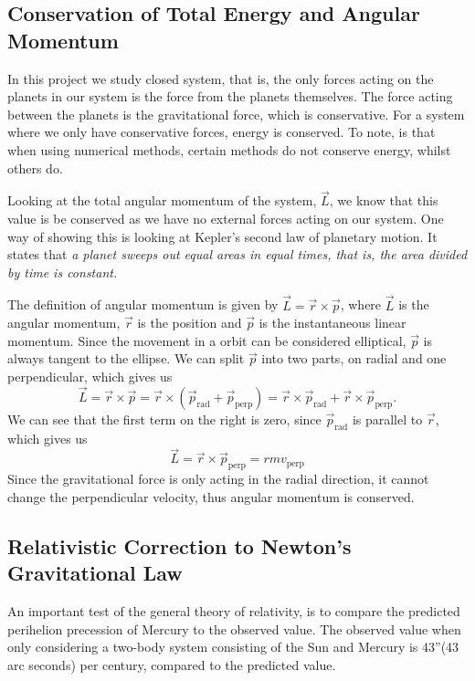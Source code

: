 \documentclass[%
reprint,
nofootinbib,
amsmath,amssymb,
aps,
]{revtex4-1}
\begin{document}
\subsection{Conservation of Total Energy and Angular Momentum} %
In this project we study closed system, that is, the only forces acting on the planets in our system is the force from the planets themselves. The force acting between the planets is the gravitational force, which is conservative. For a system where we only have conservative forces, energy is conserved\cite{book}. To note, is that when using numerical methods, certain methods do not conserve energy, whilst others do. 

Looking at the total angular momentum of the system, $\vec{L}$, we know that this value is be conserved as we have no external forces acting on our system. One way of showing this is looking at Kepler's second law of planetary motion. It states that \textit{a planet sweeps out equal areas in equal times, that is, the area divided by time is constant.}\cite{UniPhys}

The definition of angular momentum is given by $\vec{L} = \vec{r} \times \vec{p}$, where $\vec{L}$ is the angular momentum, $\vec{r}$ is the position and $\vec{p}$ is the instantaneous linear momentum. Since the movement in a orbit can be considered elliptical, $\vec{p}$ is always tangent to the ellipse. We can split $\vec{p}$ into two parts, on radial and one perpendicular, which gives us 
\begin{equation}
	\vec{L} = \vec{r} \times \vec{p} = \vec{r}\times \left(\vec{p}_{\text{rad}} + \vec{p}_{\text{perp}}\right) = \vec{r} \times \vec{p}_{\text{rad}} + \vec{r} \times \vec{p}_{\text{perp}}.
\end{equation}
We can see that the first term on the right is zero, since $\vec{p}_{\text{rad}}$ is parallel to $\vec{r}$, which gives us 
\begin{equation}
	\vec{L} = \vec{r}\times\vec{p}_{\text{perp}} = rmv_{\text{perp}}
\end{equation}
Since the gravitational force is only acting in the radial direction, it cannot change the perpendicular velocity, thus angular momentum is conserved. 


\subsection{Relativistic Correction to Newton's Gravitational Law} %

An important test of the general theory of relativity, is to compare the predicted perihelion precession of Mercury to the observed value. The observed value when only considering a two-body system consisting of the Sun and Mercury is 43''(43 arc seconds) per century, compared to the predicted value.
\end{document}
